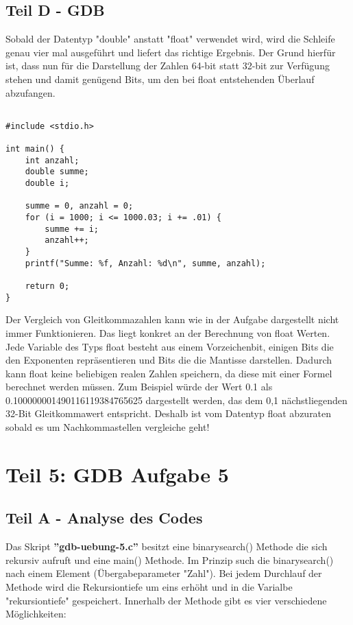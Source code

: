 \documentclass[12pt]{article}
\begin{document}
\subsection{Teil D - GDB}
Sobald der Datentyp "double" anstatt "float" verwendet wird, wird die Schleife genau vier mal ausgeführt und liefert das richtige Ergebnis. Der Grund hierfür ist, dass nun für die Darstellung der Zahlen 64-bit statt 32-bit zur Verfügung stehen und damit genügend Bits, um den bei float entstehenden Überlauf abzufangen.
\begin{lstlisting}

#include <stdio.h>

int main() {
    int anzahl;
    double summe;
    double i;

    summe = 0, anzahl = 0;
    for (i = 1000; i <= 1000.03; i += .01) {
        summe += i;
        anzahl++;
    }
    printf("Summe: %f, Anzahl: %d\n", summe, anzahl);

    return 0;
}
\end{lstlisting}
Der Vergleich von Gleitkommazahlen kann wie in der Aufgabe dargestellt nicht immer Funktionieren. Das liegt konkret an der Berechnung von float Werten. Jede Variable des Typs float besteht aus einem Vorzeichenbit, einigen Bits die den Exponenten repräsentieren und Bits die die Mantisse darstellen. Dadurch kann float keine beliebigen realen Zahlen speichern, da diese mit einer Formel berechnet werden müssen. Zum Beispiel würde der Wert 0.1 als 0.100000001490116119384765625 dargestellt werden, das dem 0,1 nächstliegenden 32-Bit Gleitkommawert entspricht. Deshalb ist vom Datentyp float abzuraten sobald es um Nachkommastellen vergleiche geht!
\newpage

\section{Teil 5: GDB Aufgabe 5}
\subsection{Teil A - Analyse des Codes}
Das Skript \textbf{”gdb-uebung-5.c”} besitzt eine binarysearch() Methode die sich rekursiv aufruft und eine main() Methode. Im Prinzip such die binarysearch() nach einem Element (Übergabeparameter "Zahl"). Bei jedem Durchlauf der Methode wird die Rekursiontiefe um eins erhöht und in die Varialbe "rekursiontiefe" gespeichert. Innerhalb der Methode gibt es vier verschiedene Möglichkeiten:\\
\end{document}
